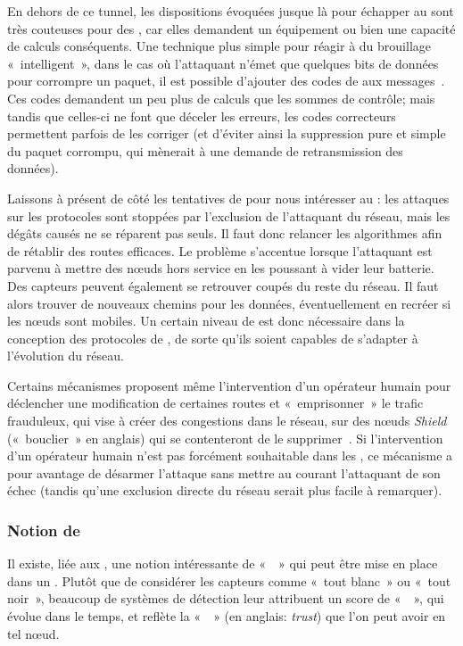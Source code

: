 En dehors de ce tunnel, les dispositions évoquées jusque là pour échapper au  sont très couteuses pour des \rcs, car elles demandent un équipement ou bien une capacité de calculs conséquents.
Une technique plus simple pour réagir à du brouillage « intelligent », dans le cas où l'attaquant n'émet que quelques bits de données pour corrompre un paquet, il est possible d'ajouter des codes de  aux messages~\cite{PI11}.
Ces codes demandent un peu plus de calculs que les sommes de contrôle; mais tandis que celles-ci ne font que déceler les erreurs, les codes correcteurs permettent parfois de les corriger (et d'éviter ainsi la suppression pure et simple du paquet corrompu, qui mènerait à une demande de retransmission des données).

Laissons à présent de côté les tentatives de  pour nous intéresser au : les attaques sur les protocoles sont stoppées par l'exclusion de l'attaquant du réseau, mais les dégâts causés ne se réparent pas seuls.
Il faut donc relancer les algorithmes afin de rétablir des routes efficaces.
Le problème s'accentue lorsque l'attaquant est parvenu à mettre des nœuds hors service en les poussant à vider leur batterie.
Des capteurs peuvent également se retrouver coupés du reste du réseau.
Il faut alors trouver de nouveaux chemins pour les données, éventuellement en recréer si les nœuds sont mobiles.
Un certain niveau de \resilience est donc nécessaire dans la conception des protocoles de , de sorte qu'ils soient capables de s'adapter à l'évolution du réseau.

Certains mécanismes proposent même l'intervention d'un opérateur humain pour déclencher une modification de certaines routes et « emprisonner » le trafic frauduleux, qui vise à créer des congestions dans le réseau, sur des nœuds \textit{Shield} (« bouclier » en anglais) qui se contenteront de le supprimer~\cite{HSP13}.
Si l'intervention d'un opérateur humain n'est pas forcément souhaitable dans les \rcs, ce mécanisme a pour avantage de désarmer l'attaque sans mettre au courant l'attaquant de son échec (tandis qu'une exclusion directe du réseau serait plus facile à remarquer).

    \subsubsection{Notion de }
Il existe, liée aux \IDS, une notion intéressante de «  » qui peut être mise en place dans un \rc.
Plutôt que de considérer les capteurs comme « tout blanc » ou « tout noir », beaucoup de systèmes de détection leur attribuent un score de « \reput », qui évolue dans le temps, et reflète la «  » (en anglais: \textit{trust}) que l'on peut avoir en tel nœud.


